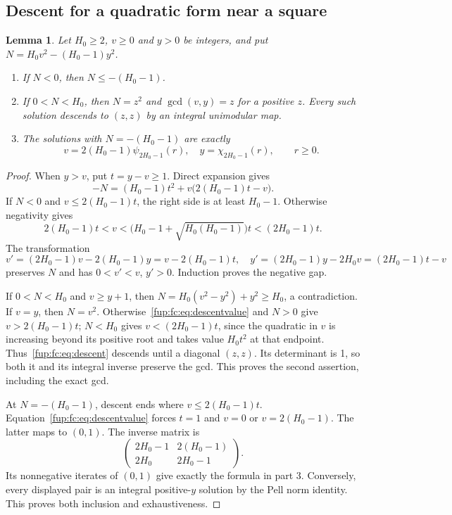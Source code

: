 \documentclass[11pt,letterpaper]{article}
\newtheorem{lemma}[theorem]{Lemma}
\theoremstyle{definition}\newtheorem{definition}[theorem]{Definition}
\theoremstyle{remark}\newtheorem{remark}[theorem]{Remark}
\newcommand{\ch}[2]{\chi_{#1}(#2)}\newcommand{\ps}[2]{\psi_{#1}(#2)}
\begin{document}
\subsection{Descent for a quadratic form near a square}
\begin{lemma}\label{fup:fc:lem:smallnorm}
Let $H_0\ge2$, $v\ge0$ and $y>0$ be integers, and put
$N=H_0v^2-(H_0-1)y^2$.
\begin{enumerate}
\item If $N<0$, then $N\le-(H_0-1)$.
\item If $0<N<H_0$, then $N=z^2$ and $\gcd(v,y)=z$ for a positive $z$.
Every such solution descends to $(z,z)$ by an integral unimodular map.
\item The solutions with $N=-(H_0-1)$ are exactly
\[
 v=2(H_0-1)\ps {2H_0-1}r,\quad
 y=\ch {2H_0-1}r,\qquad r\ge0.
\]
\end{enumerate}
\end{lemma}
\begin{proof}
When $y>v$, put $t=y-v\ge1$. Direct expansion gives
\begin{equation}
 -N=(H_0-1)t^2+v\bigl(2(H_0-1)t-v\bigr).\label{fup:fc:eq:descentvalue}
\end{equation}
If $N<0$ and $v\le2(H_0-1)t$, the right side is at least $H_0-1$.
Otherwise negativity gives
\[
 2(H_0-1)t<v<\bigl(H_0-1+\sqrt{H_0(H_0-1)}\bigr)t<(2H_0-1)t.
\]
The transformation
\begin{equation}
 v'=(2H_0-1)v-2(H_0-1)y=v-2(H_0-1)t,
 \quad y'=(2H_0-1)y-2H_0v=(2H_0-1)t-v\label{fup:fc:eq:descent}
\end{equation}
preserves $N$ and has $0<v'<v$, $y'>0$. Induction proves the negative gap.

If $0<N<H_0$ and $v\ge y+1$, then
$N=H_0(v^2-y^2)+y^2\ge H_0$, a contradiction. If $v=y$, then $N=v^2$.
Otherwise~\eqref{fup:fc:eq:descentvalue} and $N>0$ give $v>2(H_0-1)t$;
$N<H_0$ gives $v<(2H_0-1)t$, since the quadratic in $v$ is increasing
beyond its positive root and takes value $H_0t^2$ at that endpoint.
Thus~\eqref{fup:fc:eq:descent} descends until a diagonal $(z,z)$. Its determinant
is 1, so both it and its integral inverse preserve the gcd. This proves
the second assertion, including the exact gcd.

At $N=-(H_0-1)$, descent ends where $v\le2(H_0-1)t$.
Equation~\eqref{fup:fc:eq:descentvalue} forces $t=1$ and
$v=0$ or $v=2(H_0-1)$. The latter maps to $(0,1)$.
The inverse matrix is
\[
 \begin{pmatrix}2H_0-1&2(H_0-1)\\2H_0&2H_0-1\end{pmatrix}.
\]
Its nonnegative iterates of $(0,1)$ give exactly the formula in part 3.
Conversely, every displayed pair is an integral positive-$y$ solution by
the Pell norm identity. This proves both inclusion and exhaustiveness.
\end{proof}
\end{document}
